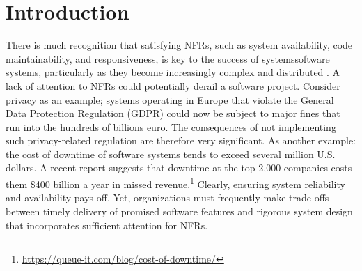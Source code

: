 \documentclass[smallextended]{svjour3}
\begin{document}
\begin{abstract}
\leavevmode\par
\vspace*{-0.5ex}
\noindent
Non-functional requirements (NFR) such as performance and maintainability are key to overall software quality. To ensure NFRs can be satisfied, it is important that developers and other stakeholders have a shared understanding of such NFRs to prevent divergence of interpretations and expensive rework as a result. 
This article is part of a research program to study the management of shared understanding of NFRs. We present a process theory comprising six propositions developed through secondary analysis of extensive field investigations of how small software organizations maintain a shared understanding of NFRs in fast-paced Continuous Software Engineering (CSE) contexts. Small organizations, including software startups, represent an important part of the software industry, but are categorically different from large organisations in that they have fewer financial and staff resources. 
Further, while literature has suggested general practices for building shared understanding, how this applies to NFRs specifically remains an open question.  
Based on this inductive theory development, the resultant theory explains how a lack of shared understanding is detected and addressed, and how the CSE context induces challenges in these processes.
\end{abstract}



\section{Introduction}\label{sec:introduction}
There is much recognition that satisfying NFRs, such as system availability, code maintainability, and responsiveness, is key to the success of systemssoftware systems, particularly as they become increasingly complex and distributed \citep{wiegers2013software, glinz_non-functional_2007,caracciolo2014software,mairiza2010investigation}. 
A lack of attention to NFRs could potentially derail a software project. Consider privacy as an example; systems operating in Europe that violate the General Data Protection Regulation (GDPR) could now be subject to major fines that run into the hundreds of billions euro. 
The consequences of not implementing such privacy-related regulation are therefore very significant. As another example: the cost of downtime of software systems tends to exceed several million U.S. dollars. 
A recent report suggests that downtime at the top 2,000 companies costs them \$400 billion a year in missed revenue.\footnote{\url{https://queue-it.com/blog/cost-of-downtime/}} Clearly, ensuring system reliability and availability pays off. 
Yet, organizations must frequently make trade-offs between timely delivery of promised software features and rigorous system design that incorporates sufficient attention for NFRs.
\end{document}

